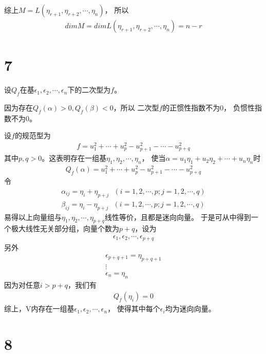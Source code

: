 \documentclass{article}
\begin{document}
综上$M = L(\eta_{r+1}, \eta_{r+2}, \cdots, \eta_n)$，
所以
\begin{align*}
  dim M = dim L(\eta_{r+1}, \eta_{r+2}, \cdots, \eta_n) = n - r
\end{align*}

\section*{7}

设$Q_f$在基$\epsilon_1, \epsilon_2, \cdots, \epsilon_n$下的二次型为$f$。

因为存在$Q_f(\alpha) > 0, Q_f(\beta) < 0$，所以
二次型$f$的正惯性指数不为0， 负惯性指数不为0。

设$f$的规范型为
\begin{align*}
  f = u_1^2 + \cdots + u_p^2 - u_{p+1}^2 - \cdots - u_{p + q}^2
\end{align*}
其中$p, q > 0$。这表明存在一组基$\eta_1, \eta_2, \cdots, \eta_n$，
使当$\alpha = u_1 \eta_1 + u_2 \eta_2 + \cdots + u_n \eta_n$时
\begin{align*}
  Q_f(\alpha) = u_1^2 + \cdots + u_p^2 - u_{p+1}^2 - \cdots - u_{p + q}^2
\end{align*}
令
\begin{align*}
  \alpha_{ij} = \eta_i + \eta_{p + j} \ \ \ (i=1,2, \cdots, p; j = 1,2, \cdots, q) \\
  \beta_{ij} = \eta_i - \eta_{p + j} \ \ \ (i=1,2, \cdots, p; j = 1,2, \cdots, q)
\end{align*}
易得以上向量组与$\eta_1, \eta_2, \cdots, \eta_{p + q}$线性等价，且都是迷向向量。
于是可从中得到一个极大线性无关部分组，向量个数为$p + q$，设为
\begin{align*}
  \epsilon_1, \epsilon_2, \cdots, \epsilon_{p + q}
\end{align*}
另外
\begin{align*}
  \epsilon_{p + q + 1} = \eta_{p + q + 1} \\
  \vdots                                  \\
  \epsilon_n = \eta_n
\end{align*}
因为对任意$i > p+q$，我们有
\begin{align*}
  Q_f(\eta_i) = 0
\end{align*}
综上，V内存在一组基$\epsilon_1, \epsilon_2, \cdots, \epsilon_n$，
使得其中每个$\epsilon_i$均为迷向向量。

\section*{8}
\end{document}
